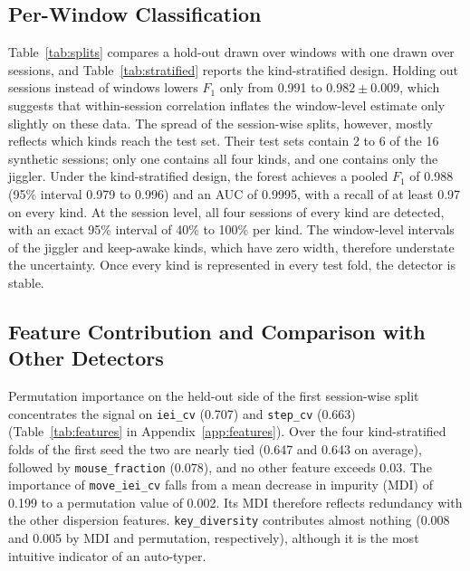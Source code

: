 \documentclass[sensors,article,submit,pdftex,oneauthor]{Definitions/mdpi}
\begin{document}
\subsection{Per-Window Classification}
\label{sec:splits}
Table~\ref{tab:splits} compares a hold-out drawn over windows with one drawn over sessions, and Table~\ref{tab:stratified} reports the kind-stratified design. Holding out sessions instead of windows lowers $F_1$ only from 0.991 to $0.982 \pm 0.009$, which suggests that within-session correlation inflates the window-level estimate only slightly on these data. The spread of the session-wise splits, however, mostly reflects which kinds reach the test set. Their test sets contain 2 to 6 of the 16 synthetic sessions; only one contains all four kinds, and one contains only the jiggler. Under the kind-stratified design, the forest achieves a pooled $F_1$ of 0.988 (95\% interval 0.979 to 0.996) and an AUC of 0.9995, with a recall of at least 0.97 on every kind. At the session level, all four sessions of every kind are detected, with an exact 95\% interval of 40\% to 100\% per kind. The window-level intervals of the jiggler and keep-awake kinds, which have zero width, therefore understate the uncertainty. Once every kind is represented in every test fold, the detector is stable.





\subsection{Feature Contribution and Comparison with Other Detectors}
\label{sec:features-models}
Permutation importance on the held-out side of the first session-wise split concentrates the signal on \texttt{iei\_cv} (0.707) and \texttt{step\_cv} (0.663) (Table~\ref{tab:features} in Appendix~\ref{app:features}). Over the four kind-stratified folds of the first seed the two are nearly tied (0.647 and 0.643 on average), followed by \texttt{mouse\_fraction} (0.078), and no other feature exceeds 0.03. The importance of \texttt{move\_iei\_cv} falls from a mean decrease in impurity (MDI) of 0.199 to a permutation value of 0.002. Its MDI therefore reflects redundancy with the other dispersion features. \texttt{key\_diversity} contributes almost nothing (0.008 and 0.005 by MDI and permutation, respectively), although it is the most intuitive indicator of an auto-typer.
\end{document}
